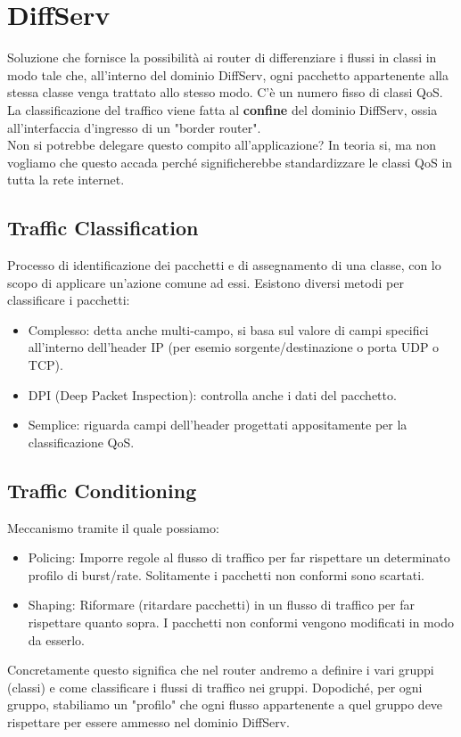 \documentclass{article}
\begin{document}
\section{DiffServ}
Soluzione che fornisce la possibilità ai router di differenziare i flussi in classi in modo tale che, all'interno del dominio DiffServ, ogni pacchetto appartenente alla stessa classe venga trattato allo stesso modo. C'è un numero fisso di classi QoS. La classificazione del traffico viene fatta al \textbf{confine} del dominio DiffServ, ossia all'interfaccia d'ingresso di un "border router".\\
Non si potrebbe delegare questo compito all'applicazione? In teoria si, ma non vogliamo che questo accada perché significherebbe standardizzare le classi QoS in tutta la rete internet.\\

\subsection{Traffic Classification}
Processo di identificazione dei pacchetti e di assegnamento di una classe, con lo scopo di applicare un'azione comune ad essi. Esistono diversi metodi per classificare i pacchetti:
\begin{itemize}
    \item Complesso: detta anche multi-campo, si basa sul valore di campi specifici all'interno dell'header IP (per esemio sorgente/destinazione o porta UDP o TCP).
    \item DPI (Deep Packet Inspection): controlla anche i dati del pacchetto.
    \item Semplice: riguarda campi dell'header progettati appositamente per la classificazione QoS.
\end{itemize}
\subsection{Traffic Conditioning} Meccanismo tramite il quale possiamo:
\begin{itemize}
    \item Policing: Imporre regole al  flusso di traffico per far rispettare un determinato profilo di burst/rate. Solitamente i pacchetti non conformi sono scartati.
    \item Shaping: Riformare (ritardare pacchetti) in un flusso di traffico per far rispettare quanto sopra. I pacchetti non conformi vengono modificati in modo da esserlo.
\end{itemize}
Concretamente questo significa che nel router andremo a definire i vari gruppi (classi) e come classificare i flussi di traffico nei gruppi. Dopodiché, per ogni gruppo, stabiliamo un "profilo" che ogni flusso appartenente a quel gruppo deve rispettare per essere ammesso nel dominio DiffServ.\\
\end{document}
